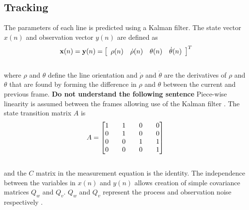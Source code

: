 \documentclass{article}
\begin{document}
\subsection{Tracking}
The parameters of each line is predicted using a Kalman filter.
The state vector $x(n)$ and observation vector $y(n)$ are defined as
\begin{equation}
    {\bf x}(n)= {\bf y}(n)
     = \left[ \begin{array}{cccc}
        \rho (n) & \dot{\rho}(n) & \theta (n) & \dot{\theta}(n)
        \end{array} \right]^T
\label{eq:state_measure_vectors}
\end{equation}\\
where $\rho$ and $\theta$ define the line orientation and $\dot{\rho}$ and $\dot{\theta}$ are the derivatives of $\rho$ and $\theta$ that are found by forming the difference in $\rho $ and $\theta $ between the current and previous frame.
{\bf Do not understand the following sentence} Piece-wise linearity is assumed between the frames allowing use of the Kalman filter \cite{hayes_statistical_1996,brookner_tracking_1998}.
The state transition matrix $A$ is
\begin{equation}
A = \begin{bmatrix} 1 && 1 && 0 && 0 \\ 0 && 1 && 0 && 0 \\ 0 && 0 && 1 && 1 \\ 0 && 0 && 0 && 1 \\\end{bmatrix}\\
\label{eq:state_trans}
\end{equation}\\
and the $C$ matrix in the measurement equation is the identity.
The independence between the variables in $x(n)$ and $y(n)$ allows creation of simple covariance matrices $Q_w$ and $Q_v$. $Q_w$ and $Q_v$ represent the process and observation noise respectively \cite{hayes_statistical_1996}.
\end{document}
